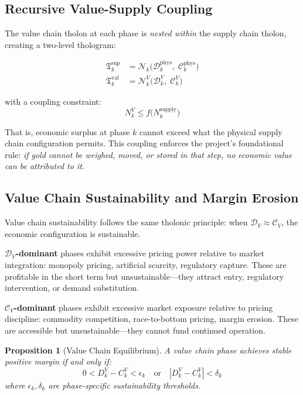 \documentclass[12pt,a4paper,twocolumn]{article}
\newtheorem{proposition}[theorem]{Proposition}
\newcommand{\N}{\mathcal{N}}
\newcommand{\D}{\mathcal{D}}
\newcommand{\CC}{\mathcal{C}}
\newcommand{\tholon}{\mathfrak{T}}
\begin{document}
\subsection{Recursive Value-Supply Coupling}

The value chain tholon at each phase is \emph{nested within} the supply chain tholon, creating a two-level thologram:

\begin{align}
\label{eq:nested}
\tholon_k^{\mathrm{sup}} &= \N_k\!\bigl(\D_k^{\mathrm{phys}},\; \CC_k^{\mathrm{phys}}\bigr) \\
\tholon_k^{\mathrm{val}} &= \N_k^V\!\bigl(\D_k^V,\; \CC_k^V\bigr) \nonumber
\end{align}

with a coupling constraint:
\begin{equation}
N_k^V \leq f\bigl(N_k^{\mathrm{supply}}\bigr)
\end{equation}

That is, economic surplus at phase $k$ cannot exceed what the physical supply chain configuration permits.
This coupling enforces the project's foundational rule: \emph{if gold cannot be weighed, moved, or stored in that step, no economic value can be attributed to it}.

\subsection{Value Chain Sustainability and Margin Erosion}

Value chain sustainability follows the same tholonic principle: when $\D_V \approx \CC_V$, the economic configuration is sustainable.

\textbf{$\D_V$-dominant} phases exhibit excessive pricing power relative to market integration: monopoly pricing, artificial scarcity, regulatory capture.
These are profitable in the short term but unsustainable---they attract entry, regulatory intervention, or demand substitution.

\textbf{$\CC_V$-dominant} phases exhibit excessive market exposure relative to pricing discipline: commodity competition, race-to-bottom pricing, margin erosion.
These are accessible but unsustainable---they cannot fund continued operation.

\begin{proposition}[Value Chain Equilibrium]
A value chain phase achieves stable positive margin if and only if:
\begin{equation}
0 < D_k^V - C_k^V < \epsilon_k \quad \text{or} \quad |D_k^V - C_k^V| < \delta_k
\end{equation}
where $\epsilon_k, \delta_k$ are phase-specific sustainability thresholds.
\end{proposition}
\end{document}
